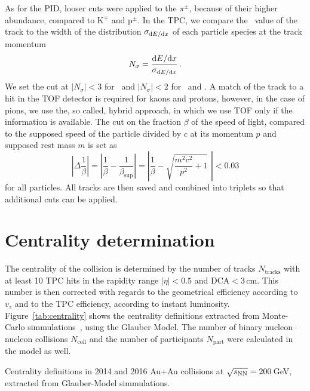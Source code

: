 As for the PID, looser cuts were applied to the $\pi^\pm$, because of their higher abundance, compared to K$^\mp$ and p$^\pm$. In the TPC, we compare the \dedx\ value of the track to the width of the distribution $\sigma_{\mathrm{d} E / \mathrm{d} x}$ of each particle species at the track momentum
\begin{equation}
N_\sigma = \frac{\mathrm{d} E / \mathrm{d} x}{\sigma_{\mathrm{d} E / \mathrm{d} x}}\,. 
\end{equation}
We set the cut at $|N_\sigma| < 3$ for \pipm\ and $|N_\sigma| < 2$ for \Kmp\ and \ppm\@. A match of the track to a hit in the TOF detector is required for kaons and protons, however, in the case of pions, we use the, so called, hybrid approach, in which we use TOF only if the information is available. The cut on the fraction $\beta$ of the speed of light, compared to the supposed speed of the particle divided by $c$ at its momentum $p$ and supposed rest mass $m$ is set as
\begin{equation}
 \left|\Delta \frac{1}{\beta}\right| = \left| \frac{1}{\beta} - \frac{1}{\beta_\mathrm{sup}} \right| = \left| \frac{1}{\beta} - \sqrt{\frac{m^2c^2}{p^2} + 1} \,\,\right| < 0.03
\end{equation}
for all particles. All tracks are then saved and combined into triplets so that additional cuts can be applied.

\section{Centrality determination}
The centrality of the collision is determined by the number of tracks $N_\mathrm{tracks}$ with at least 10 TPC hits in the rapidity range $|\eta| < 0.5$ and $\mathrm{DCA} < 3\,$cm. This number is then corrected with regards to the geometrical efficiency according to $v_z$ and to the TPC efficiency, according to instant luminosity. Figure~\ref{tab:centrality} shows the centrality definitions extracted from Monte-Carlo simmulations~\cite{centrality, HiroshiCentrality}, using the Glauber Model. The number of binary nucleon--nucleon collisions $N_\mathrm{coll}$ and the number of participants $N_\mathrm{part}$ were calculated in the model as well.

\begin{table}[!htb]
\caption{\label{tab:centrality} Centrality definitions in 2014 and 2016 Au+Au collisions at $\sqrt{s_\text{NN}} = 200\,$GeV, extracted from Glauber-Model simmulations.}
\begin{center}


\end{center}
\end{table}


